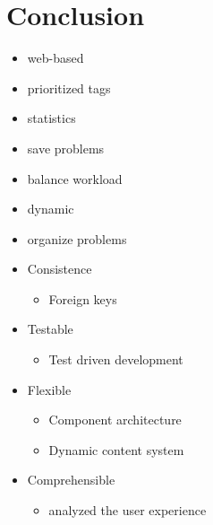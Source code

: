 \section*{Conclusion}
\begin{frame}
\begin{itemize}
	\item web-based 
	\item prioritized tags
	\item statistics
	\item save problems
	\item balance workload
	\item dynamic
	\item organize problems
\end{itemize}

\begin{itemize}
	\item Consistence
	\begin{itemize}
		\item Foreign keys
	\end{itemize}
	\item Testable 
	\begin{itemize}
		\item Test driven development
	\end{itemize}
	\item Flexible
	\begin{itemize}
		\item Component architecture
		\item Dynamic content system
	\end{itemize}
	\item Comprehensible
	\begin{itemize}
		\item analyzed the user experience 
	\end{itemize}
\end{itemize}



\end{frame}
